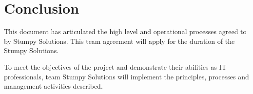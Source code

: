 \documentclass[12pt, a4paper, onecolumn]{article}
\begin{document}
\newpage
\section{Conclusion}
This document has articulated the high level and operational
processes agreed to by Stumpy Solutions.  This team agreement
will apply for the duration of the Stumpy Solutions.

To meet the objectives of the project and demonstrate their
abilities as IT professionals, team Stumpy Solutions will implement
the principles, processes and management activities described.

\newpage
\begin{thebibliography}{9}
\end{thebibliography}

\newpage
\begin{appendices}
\end{appendices}
\end{document}
